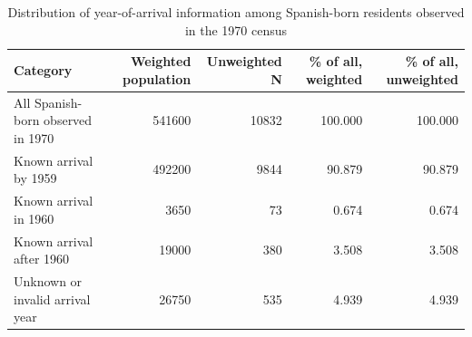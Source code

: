 \begin{table}

\caption{Distribution of year-of-arrival information among Spanish-born residents observed in the 1970 census}
\centering
\begin{tabular}[t]{lrrrr}
\toprule
Category & Weighted population & Unweighted N & \% of all, weighted & \% of all, unweighted\\
\midrule
All Spanish-born observed in 1970 & 541600 & 10832 & 100.000 & 100.000\\
Known arrival by 1959 & 492200 & 9844 & 90.879 & 90.879\\
Known arrival in 1960 & 3650 & 73 & 0.674 & 0.674\\
Known arrival after 1960 & 19000 & 380 & 3.508 & 3.508\\
Unknown or invalid arrival year & 26750 & 535 & 4.939 & 4.939\\
\bottomrule
\end{tabular}
\end{table}

